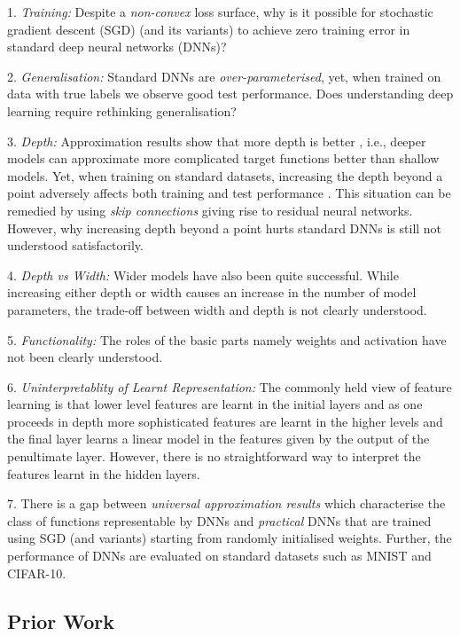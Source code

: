 \documentclass{article}
\begin{document}
1. \emph{Training:} Despite a \emph{non-convex} loss surface, why is it possible for stochastic gradient descent (SGD) (and its variants) to achieve zero training error in standard deep neural networks (DNNs)?

2. \emph{Generalisation:} Standard DNNs are \emph{over-parameterised}, yet, when trained on data with true labels we observe good test performance. Does understanding deep learning require rethinking generalisation? \cite{ben}

3. \emph{Depth:} Approximation results show that more depth is better \cite{depth1,depth2}, i.e., deeper models can approximate more complicated target functions better than shallow models. Yet, when training on standard datasets, increasing the depth beyond a point adversely affects both training and test performance \cite{resnets}. This situation can be remedied by using \emph{skip connections} giving rise to residual neural networks. However, why increasing depth beyond a point hurts standard DNNs is still not understood satisfactorily. 

4. \emph{Depth vs Width:} Wider models \cite{wide1,wide2,wide3} have also been quite successful. While increasing either depth or width causes an increase in the number of model parameters, the trade-off between width and depth is not clearly understood.

5. \emph{Functionality:} The roles of the basic parts namely weights and activation have not been clearly understood.

6. \emph{Uninterpretablity of Learnt Representation:} The commonly held view of feature learning is that lower level features are learnt in the initial layers and as one proceeds in depth more sophisticated features are learnt in the higher levels and the final layer learns a linear model in the features given by the output of the penultimate layer. However, there is no straightforward way to interpret the features learnt in the hidden layers.

7. There is a gap between \emph{universal approximation results} which characterise the class of functions representable by DNNs and \emph{practical} DNNs that are trained using SGD (and variants) starting from randomly initialised weights. Further, the performance of DNNs are evaluated on standard datasets such as MNIST and CIFAR-10. 

\subsection{Prior Work}
\end{document}
